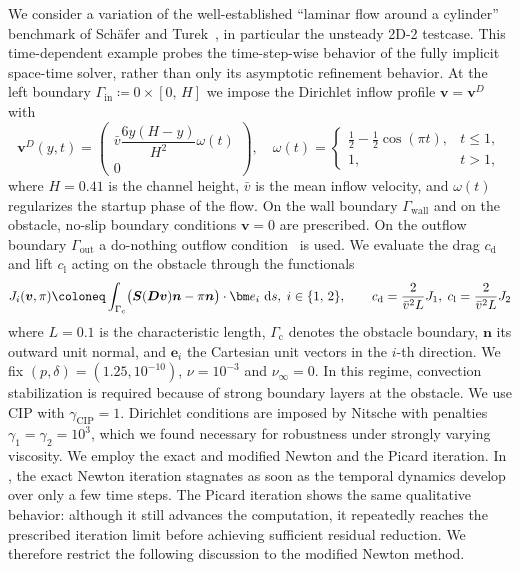 \documentclass[DIV=16]{scrartcl}
\newcommand{\uu}{\boldsymbol v}
\newcommand{\nn}{\boldsymbol n}
\newcommand{\DD}{\boldsymbol D} %
\newcommand{\Sstress}{\boldsymbol S} %
\newcommand{\drv}{\mkern3mu\mathrm{d}}
\newcommand{\reg}{\delta}
\newcommand{\pn}{p}
\newcommand{\gOne}{\gamma_{1}}  %
\newcommand{\gTwo}{\gamma_{2}}  %
\newcommand{\gCIP}{\gamma_{\mathrm{CIP}}}  %
\begin{document}
We consider a variation of the well-established ``laminar flow around a
cylinder'' benchmark of Sch\"afer and Turek~\cite{SchaeferTurek1996}, in
particular the unsteady 2D-2 testcase. This time-dependent example probes the time-step-wise
behavior of the fully implicit space-time solver, rather than only its asymptotic refinement behavior.
At the left boundary $\Gamma_{\mathrm{in}}\coloneq
0\times [0,\,H]$ we impose the Dirichlet inflow profile $\uu=\uu^D$ with
\begin{equation}
\uu^D(y,t) = \begin{pmatrix}
\bar{v}\dfrac{6y(H-y)}{H^2}\omega(t)\\[0.3em]
0
\end{pmatrix},
\quad \omega(t) = \begin{cases} \frac{1}{2}- \frac{1}{2}\cos( \pi t), & t\le 1, \\ 1, & t>1,
\end{cases}
\end{equation}
where $H=0.41$ is the channel height, $\bar v$ is the mean inflow velocity, and
$\omega(t)$ regularizes the startup phase of the flow. On the wall boundary
$\Gamma_{\mathrm{wall}}$ and on the obstacle, no-slip boundary conditions
$\uu=0$ are prescribed. On the outflow boundary $\Gamma_{\mathrm{out}}$ a
do-nothing outflow condition~\cite{HeywoodRannacherTurek1992} is used.
We evaluate the drag $c_{\mathrm d}$ and lift $c_{\mathrm l}$ acting on the obstacle through the functionals
\begin{equation}\label{eq:drag-lift}
  J_{i}(\uu,\pi)
  \coloneq \int_{\Gamma_{\mathrm c}}
  \bigl(\Sstress(\DD\uu)\nn-\pi\nn\bigr)\cdot\bm e_i \, \drv s,\; i\in\{1,\,2\},\qquad
  c_{\mathrm{d}}=\frac{2}{\bar v^{2} L}J_1,\;c_{\mathrm{l}}=\frac{2}{\bar v^{2} L}J_2
\end{equation}
where $L=0.1$ is the characteristic length, $\Gamma_{\mathrm c}$ denotes the
obstacle boundary, $\nn$ its outward unit normal, and $\bm e_i$ the Cartesian
unit vectors in the $i$-th direction. We fix $(\pn,\reg)=(1.25,10^{-10})$,
$\nu=10^{-3}$ and $\nu_\infty=0$. In this regime, convection stabilization is
required because of strong boundary layers at the obstacle. We use CIP with
$\gCIP=1$. Dirichlet conditions are imposed by Nitsche with penalties
$\gOne=\gTwo=10^3$, which we found necessary for robustness under strongly
varying viscosity. We employ the exact and modified Newton and the Picard
iteration. In , the exact Newton iteration stagnates as soon
as the temporal dynamics develop over only a few time steps. The Picard
iteration shows the same qualitative behavior: although it still advances the
computation, it repeatedly reaches the prescribed iteration limit before
achieving sufficient residual reduction. We therefore restrict the following
discussion to the modified Newton method.
\end{document}
